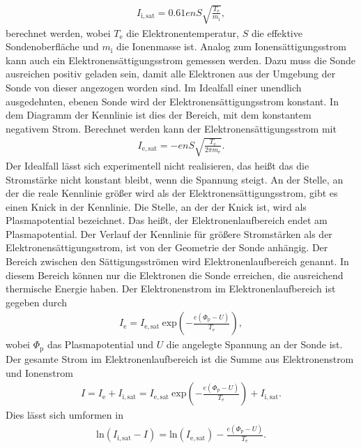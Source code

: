 \begin{align}
 I_{\mathrm{i},\mathrm{sat}}=0.61enS \sqrt{\frac{T_\mathrm{e}}{m_{\mathrm{i}}}},
\end{align} 
berechnet werden, wobei $T_{\mathrm{e}}$ die Elektronentemperatur, $S$ die effektive Sondenoberfläche und $m_{\mathrm{i}}$ die Ionenmasse ist. Analog zum Ionensättigungsstrom kann auch ein Elektronensättigungsstrom gemessen werden. Dazu muss die Sonde ausreichen positiv geladen sein, damit alle Elektronen aus der Umgebung der Sonde von dieser angezogen worden sind. Im Idealfall einer unendlich ausgedehnten, ebenen Sonde wird der Elektronensättigungsstrom konstant. In dem Diagramm der Kennlinie ist dies der Bereich, mit dem konstantem negativem Strom. Berechnet werden kann der Elektronensättigungsstrom mit
\begin{align}
I_{\mathrm{e},\mathrm{sat}}=-enS \sqrt{\frac{T_{\mathrm{e}}}{2\pi m_{\mathrm{e}}}}.
\label{eq:Ionensättigungsstrom}
\end{align}
Der Idealfall lässt sich experimentell nicht realisieren, das heißt das die Stromstärke nicht konstant bleibt, wenn die Spannung steigt. An der Stelle, an der die reale Kennlinie größer wird als der Elektronensättigungsstrom, gibt es einen Knick in der Kennlinie. Die Stelle, an der der Knick ist, wird als Plasmapotential bezeichnet. Das heißt, der Elektronenlaufbereich endet am Plasmapotential. Der Verlauf der Kennlinie für größere Stromstärken als der Elektronensättigungsstrom, ist von der Geometrie der Sonde anhängig. Der Bereich zwischen den Sättigungsströmen wird Elektronenlaufbereich genannt. In diesem Bereich können nur die Elektronen die Sonde erreichen, die  ausreichend thermische Energie haben. Der Elektronenstrom im Elektronenlaufbereich ist gegeben durch
\begin{align}
I_{\mathrm{e}}=I_{\mathrm{e},\mathrm{sat}}\ \mathrm{exp} \left( -\frac{e(\Phi_{\mathrm{p}}-U)}{T_{\mathrm{e}}} \right),
\label{eq:Elektronenlaufbereich}
\end{align}
wobei $\Phi_{\mathrm{p}}$ das Plasmapotential und $U$ die angelegte Spannung an der Sonde ist. Der gesamte Strom im Elektronenlaufbereich ist die Summe aus Elektronenstrom und Ionenstrom
\begin{align}
I=I_{\mathrm{e}} +  I_{\mathrm{i},\mathrm{sat}}=  I_{\mathrm{e},\mathrm{sat}}\ \mathrm{exp} \left( -\frac{e(\Phi_{\mathrm{p}}-U)}{T_{\mathrm{e}}} \right) + I_{\mathrm{i},\mathrm{sat}}.
\end{align}
Dies lässt sich umformen in
\begin{align}
\mathrm{ln}(I_{\mathrm{i},\mathrm{sat}} -I) = \mathrm{ln}(I_{\mathrm{e},\mathrm{sat}}) - \frac{e(\Phi_{\mathrm{p}}-U)}{T_{\mathrm{e}}}.
\end{align}
